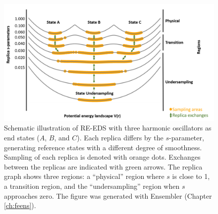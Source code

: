 \begin{figure}[h]
    \centering
    \includegraphics[width=\columnwidth]{fig/theory/Reeds_scheme_first.png}
    \caption{Schematic illustration of RE-EDS with three harmonic oscillators as end states ($A$, $B$, and $C$). Each replica differs by the $s$-parameter, generating reference states with a different degree of smoothness. Sampling of each replica is denoted with orange dots. Exchanges between the replicas are indicated with green arrows. The replica graph shows three regions: a ``physical'' region where $s$ is close to 1, a transition region, and the ``undersampling'' region when $s$ approaches zero. The figure was generated with Ensembler \cite{Ries2021}  (Chapter \ref{ch:feens}).}
    \label{fig:RE-EDS_Scheme}
\end{figure}

\FloatBarrier

